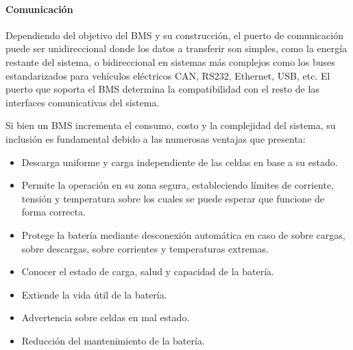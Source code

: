 \paragraph{Comunicación}
Dependiendo del objetivo del BMS y su construcción, el puerto de comunicación puede ser unidireccional donde los datos a transferir son simples, como la energía restante del sistema, o bidireccional en sistemas más complejos como los buses estandarizados para vehículos eléctricos CAN, RS232, Ethernet, USB, etc. El puerto que soporta el BMS determina la compatibilidad con el resto de las interfaces comunicativas del sistema.

Si bien un BMS incrementa el consumo, costo y la complejidad del sistema, su inclusión es fundamental debido a las numerosas ventajas que presenta:

\begin{itemize}
    \item Descarga uniforme y carga independiente de las celdas en base a su estado.
    \item Permite la operación en su zona segura, estableciendo límites de corriente, tensión y temperatura sobre los cuales se puede esperar que funcione de forma correcta.
    \item Protege la batería mediante desconexión automática en caso de sobre cargas, sobre descargas, sobre corrientes y temperaturas extremas.
    \item Conocer el estado de carga, salud y capacidad de la batería.
    \item Extiende la vida útil de la batería.
    \item Advertencia sobre celdas en mal estado.
    \item Reducción del mantenimiento de la batería.
\end{itemize}